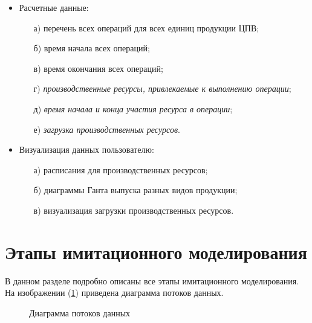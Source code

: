 \begin{itemize}
	\item Расчетные данные:	
		\begin{itemize}
			\item[а)] перечень всех операций для всех единиц продукции ЦПВ;
			\item[б)] время начала всех операций;
			\item[в)] время окончания всех операций;
			\item[г)] \textit{производственные ресурсы, привлекаемые к выполнению операции};
			\item[д)] \textit{время начала и конца участия ресурса в операции};
			\item[е)] \textit{загрузка производственных ресурсов}.
		\end{itemize}		
	\item Визуализация данных пользователю:
		\begin{itemize}
			\item[а)] расписания для производственных ресурсов;
			\item[б)] диаграммы Ганта выпуска разных видов продукции;
			\item[в)] визуализация загрузки производственных ресурсов.
		\end{itemize}		 
\end{itemize}

\section{Этапы имитационного моделирования}
В данном разделе подробно описаны все этапы имитационного моделирования.
На изображении (\ref{ris:DataFlow}) приведена диаграмма потоков данных.

\begin{figure}[H]
    \caption{Диаграмма потоков данных}
    \label{ris:DataFlow}
\end{figure}

